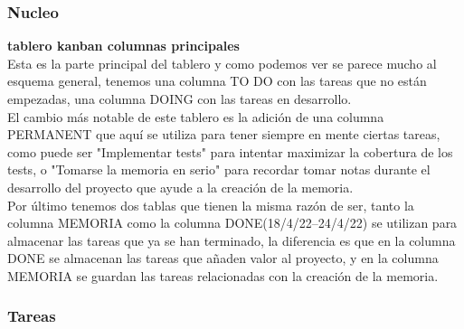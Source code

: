 \documentclass[12pt,a4paper]{article}
\begin{document}
	\subsubsection{Nucleo}
	\textbf{tablero kanban columnas principales}\\
	Esta es la parte principal del tablero y como podemos ver se parece mucho al esquema general, tenemos una columna TO DO con las tareas que no están empezadas, una columna DOING con las tareas en desarrollo.\\
	El cambio más notable de este tablero es la adición de una columna PERMANENT que aquí se utiliza para tener siempre en mente ciertas tareas, como puede ser "Implementar tests" para intentar maximizar la cobertura de los tests, o "Tomarse la memoria en serio" para recordar tomar notas durante el desarrollo del proyecto que ayude a la creación de la memoria.\\
	Por último tenemos dos tablas que tienen la misma razón de ser, tanto la columna MEMORIA como la columna DONE(18/4/22--24/4/22) se utilizan para almacenar las tareas que ya se han terminado, la diferencia es que en la columna DONE se almacenan las tareas que añaden valor al proyecto, y en la columna MEMORIA se guardan las tareas relacionadas con la creación de la memoria.
	\subsubsection{Tareas}
\end{document}
